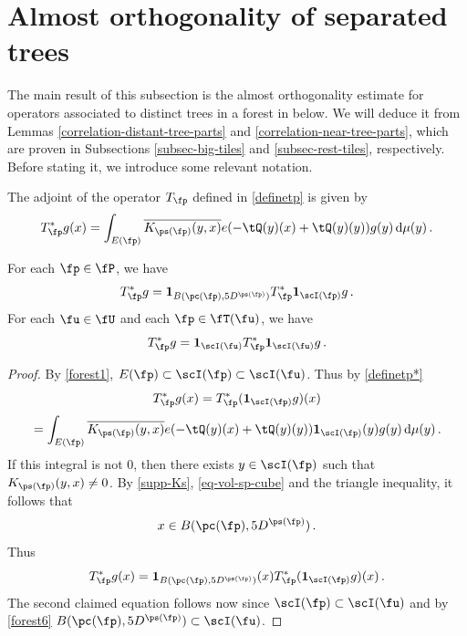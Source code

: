 \section{Almost orthogonality of separated trees}

The main result of this subsection is the almost orthogonality estimate for operators associated to distinct trees in a forest in  below. We will deduce it from Lemmas \ref{correlation-distant-tree-parts} and \ref{correlation-near-tree-parts}, which are proven in Subsections \ref{subsec-big-tiles} and \ref{subsec-rest-tiles}, respectively. Before stating it, we introduce some relevant notation.

The adjoint of the operator $T_{\fp}$ defined in \eqref{definetp} is given by
\begin{equation}
    \label{definetp*}
    T_{\fp}^* g(x) = \int_{E(\fp)} \overline{K_{\ps(\fp)}(y,x)} e(-\tQ(y)(x)+ \tQ(y)(y)) g(y) \, \mathrm{d}\mu(y)\,.
\end{equation}

\begin{lemma}
    \label{adjoint-tile-support}
    \leanok
    For each $\fp \in \fP$, we have
    $$
        T_{\fp}^* g = \mathbf{1}_{B(\pc(\fp), 5D^{\ps(\fp)})} T_{\fp}^* \mathbf{1}_{\scI(\fp)} g\,.
    $$
    For each $\fu \in \fU$ and each $\fp \in \fT(\fu)$, we have
    $$
        T_{\fp}^* g = \mathbf{1}_{\scI(\fu)} T_{\fp}^* \mathbf{1}_{\scI(\fu)} g\,.
    $$
\end{lemma}

\begin{proof}
    By \eqref{forest1}, $E(\fp) \subset \scI(\fp) \subset \scI(\fu)$. Thus by \eqref{definetp*}
    $$
         T_{\fp}^* g(x) = T_{\fp}^* (\mathbf{1}_{\scI(\fp)} g)(x)
    $$
    $$
        = \int_{E(\fp)} \overline{K_{\ps(\fp)}(y,x)} e(-\tQ(y)(x) + \tQ(y)(y)) \mathbf{1}_{\scI(\fp)}(y) g(y) \, \mathrm{d}\mu(y)\,.
    $$
    If this integral is not $0$, then there exists $y \in \scI(\fp)$ such that $K_{\ps(\fp)}(y,x) \ne 0$. By \eqref{supp-Ks}, \eqref{eq-vol-sp-cube} and the triangle inequality, it follows that
    \begin{equation*}
        x \in B(\pc(\fp), 5 D^{\ps(\fp)})\, .
    \end{equation*}
    Thus
    $$
        T_{\fp}^* g(x) = \mathbf{1}_{B(\pc(\fp), 5D^{\ps(\fp)})}(x) T_{\fp}^* (\mathbf{1}_{\scI(\fp)} g)(x)\,.
    $$
    The second claimed equation follows now since $\scI(\fp) \subset \scI(\fu)$ and by \eqref{forest6} $B(\pc(\fp), 5D^{\ps(\fp)}) \subset \scI(\fu)$.
\end{proof}

